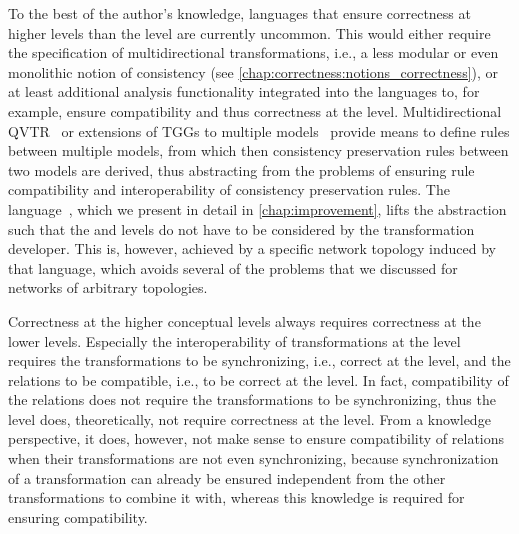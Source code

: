 To the best of the author's knowledge, languages that ensure correctness at higher levels than the \leveltransformation level are currently uncommon.
This would either require the specification of multidirectional transformations, i.e., a less modular or even monolithic notion of consistency (see \autoref{chap:correctness:notions_correctness}), or at least additional analysis functionality integrated into the languages to, for example, ensure compatibility and thus correctness at the \levelnetworkrule level.
Multidirectional \gls{QVTR}~\cite{macedo2014FrameworkMultiDirectional-BX} or extensions of \glspl{TGG} to multiple models~\cite{koenigs2006MGGs-SoSym,trollmann2015TransformationTGGtoMultiModel-ICMT,trollmann2016SynchronizationTGGtoMultiModel-ICMT} provide means to define rules between multiple models, from which then consistency preservation rules between two models are derived, thus abstracting from the problems of ensuring rule compatibility and interoperability of consistency preservation rules.
The \commonalities language~, which we present in detail in \autoref{chap:improvement}, lifts the abstraction such that the \levelnetworkrelation and \levelnetworkrule levels do not have to be considered by the transformation developer.
This is, however, achieved by a specific network topology induced by that language, which avoids several of the problems that we discussed for networks of arbitrary topologies.

Correctness at the higher conceptual levels always requires correctness at the lower levels.
Especially the interoperability of transformations at the \levelnetworkrule level requires the transformations to be synchronizing, i.e., correct at the \leveltransformation level, and the relations to be compatible, i.e., to be correct at the \levelnetworkrelation level.
In fact, compatibility of the relations does not require the transformations to be synchronizing, thus the \levelnetworkrelation level does, theoretically, not require correctness at the \leveltransformation level.
From a knowledge perspective, it does, however, not make sense to ensure compatibility of relations when their transformations  are not even synchronizing, because synchronization of a transformation can already be ensured independent from the other transformations to combine it with, whereas this knowledge is required for ensuring compatibility.
